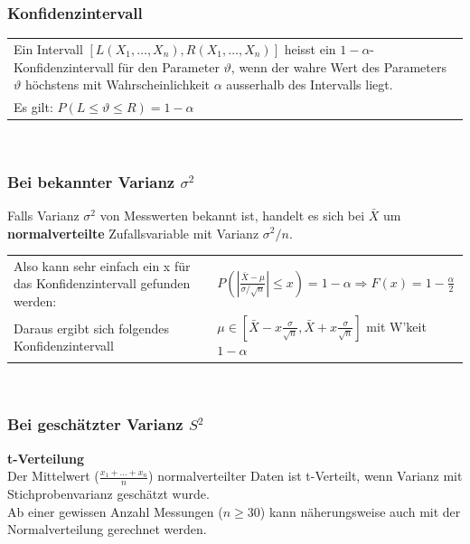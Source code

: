 		\subsubsection{Konfidenzintervall }
			\begin{tabular}{p{18cm}}
		     Ein Intervall $[L(X_1,\ldots,X_n),R(X_1,\ldots,X_n)]$ heisst ein
		     $1-\alpha$- Konfidenzintervall für den Parameter $\vartheta$, wenn der wahre
		     Wert des Parameters $\vartheta$ höchstens mit Wahrscheinlichkeit $\alpha$
		     ausserhalb des Intervalls liegt.\\
		     Es gilt: $P(L \leq \vartheta \leq R) = 1-\alpha$
		    \end{tabular}\\
		    
	   
    \subsubsection{Bei bekannter Varianz $\sigma^2$}
     Falls Varianz $\sigma^2$ von Messwerten bekannt ist, handelt es sich bei $\bar{X}$ um \textbf{normalverteilte} Zufallsvariable mit Varianz $\sigma^2/n$. \\
    \begin{tabular}{p{8cm}p{8cm}}
    Also kann sehr einfach ein x für das Konfidenzintervall gefunden werden:
    &$P\left(\left|\frac{\bar{X}-\mu}{\sigma / \sqrt{n}}\right|\leq x\right) = 1 - \alpha \Rightarrow F(x) = 1- \frac{\alpha}{2}$\\
    Daraus ergibt sich folgendes Konfidenzintervall
    &$\mu\in\left[\bar{X}-x\frac{\sigma}{\sqrt{n}},\bar{X}+x\frac{\sigma}{\sqrt{n}}\right]$ mit W'keit $1-\alpha$\\
    \end{tabular}\\
    
    \subsubsection{Bei geschätzter Varianz $S^2$}
    \textbf{t-Verteilung}\\
    	Der Mittelwert ($\frac{x_1+\ldots+x_n}{n}$) normalverteilter Daten ist
        t-Verteilt, wenn Varianz mit Stichprobenvarianz geschätzt wurde.\\
        Ab einer gewissen Anzahl Messungen ($n \geq 30$) kann näherungsweise auch mit
        der Normalverteilung gerechnet werden.  \\
    
